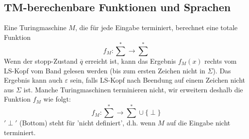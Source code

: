 \subsection{TM-berechenbare Funktionen und Sprachen}

Eine Turingmaschine $M$, die für jede Eingabe terminiert, berechnet eine totale Funktion $$f_M:\sum\limits^* \rightarrow \sum\limits^*$$ Wenn der stopp-Zustand $\overline{q}$ erreicht ist, kann das Ergebnis $f_M(x)$ rechts vom LS-Kopf vom Band gelesen werden (bis zum ersten Zeichen nicht in $\Sigma$). Das Ergebnis kann auch $\varepsilon$ sein,  falls LS-Kopf nach Beendung auf einem Zeichen nicht aus $\Sigma$ ist. Manche Turingmaschinen terminieren nicht, wir erweitern deshalb die Funktion $f_M$ wie folgt: $$ f_M:\sum\limits^* \rightarrow \sum\limits^* \cup \{ \perp \} $$ $'\perp'$ (Bottom) steht für 'nicht definiert', d.h. wenn $M$ auf die Eingabe nicht terminiert.